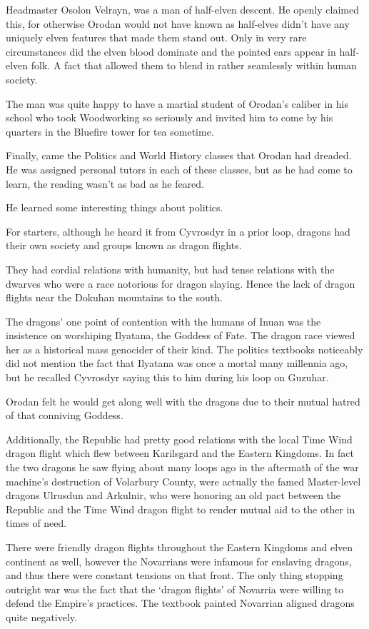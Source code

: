 \documentclass[a4paper,10pt]{book}
\begin{document}
Headmaster Osolon Velrayn, was a man of half-elven descent. He openly claimed this, for otherwise Orodan would not have known as half-elves didn’t have any uniquely elven features that made them stand out. Only in very rare circumstances did the elven blood dominate and the pointed ears appear in half-elven folk. A fact that allowed them to blend in rather seamlessly within human society.\par
The man was quite happy to have a martial student of Orodan’s caliber in his school who took Woodworking so seriously and invited him to come by his quarters in the Bluefire tower for tea sometime.\par
Finally, came the Politics and World History classes that Orodan had dreaded. He was assigned personal tutors in each of these classes, but as he had come to learn, the reading wasn’t as bad as he feared.\par
He learned some interesting things about politics.\par
For starters, although he heard it from Cyvrosdyr in a prior loop, dragons had their own society and groups known as dragon flights.\par
They had cordial relations with humanity, but had tense relations with the dwarves who were a race notorious for dragon slaying. Hence the lack of dragon flights near the Dokuhan mountains to the south.\par
The dragons’ one point of contention with the humans of Inuan was the insistence on worshiping Ilyatana, the Goddess of Fate. The dragon race viewed her as a historical mass genocider of their kind. The politics textbooks noticeably did not mention the fact that Ilyatana was once a mortal many millennia ago, but he recalled Cyvrosdyr saying this to him during his loop on Guzuhar.\par
Orodan felt he would get along well with the dragons due to their mutual hatred of that conniving Goddess.\par
Additionally, the Republic had pretty good relations with the local Time Wind dragon flight which flew between Karilsgard and the Eastern Kingdoms. In fact the two dragons he saw flying about many loops ago in the aftermath of the war machine’s destruction of Volarbury County, were actually the famed Master-level dragons Ulrusdun and Arkulnir, who were honoring an old pact between the Republic and the Time Wind dragon flight to render mutual aid to the other in times of need.\par
There were friendly dragon flights throughout the Eastern Kingdoms and elven continent as well, however the Novarrians were infamous for enslaving dragons, and thus there were constant tensions on that front. The only thing stopping outright war was the fact that the ‘dragon flights’ of Novarria were willing to defend the Empire’s practices. The textbook painted Novarrian aligned dragons quite negatively.\par
\end{document}
